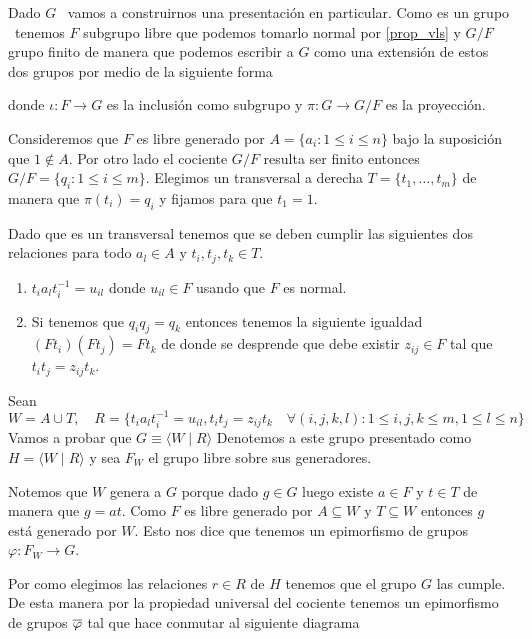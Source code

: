 \documentclass[tesis.tex]{subfiles}
\begin{document}
\begin{obs}\label{obs_presentacion_vl}
	Dado $G$ \vl \ vamos a construirnos una presentación en particular.
	Como es un grupo \vl \ tenemos $F$ subgrupo libre que podemos tomarlo normal por \ref{prop_vls} y $G/F$ grupo finito de manera que podemos escribir a $G$ como una extensión de estos dos grupos por medio de la siguiente forma
	\begin{center}
	\end{center}
	donde $\iota: F \to G$ es la inclusión como subgrupo y $\pi: G \to G/F$ es la proyección.

	
	Consideremos que $F$ es libre generado por $A = \{ a_i : 1 \le i \le n \}$ bajo la suposición que $1 \notin A$.
	Por otro lado el cociente $G/F$ resulta ser finito entonces $G/F = \{ q_i : 1 \le i \le m \}$.
	Elegimos un transversal a derecha $T = \{ t_1, \dots, t_m \}$ de manera que $\pi(t_i)= q_i$ y fijamos para que $t_1 = 1$.
	
	Dado que es un transversal tenemos que se deben cumplir las siguientes dos relaciones para todo $a_l \in A$ y $t_i,t_j,t_k \in T$. 
	\begin{enumerate}
		\item $t_ia_{l}t_i^{-1} = u_{il}$ donde $u_{il} \in F$ usando que $F$ es normal.
		\item Si tenemos que $q_iq_j = q_k$ entonces tenemos la siguiente igualdad 
		$(Ft_{i}) (Ft_{j}) = Ft_{k}$
		de donde se desprende que debe existir $z_{ij} \in F$ tal que 
		 $t_it_j = z_{ij}t_k$.
	\end{enumerate}
	Sean
	\[
		W = A \cup T, \quad R = \{t_ia_{l}t_i^{-1} = u_{il},  t_it_j = z_{ij}t_k \quad \forall (i,j,k,l) :   1 \le i,j,k \le m, 1 \le l  \le n \}
	\]
	Vamos a probar que $G \equiv \langle W \mid R \rangle$ 
	Denotemos a este grupo presentado como $H = \langle W \mid R \rangle$ y sea $F_{W}$ el grupo libre sobre sus generadores.
	
	Notemos que $W$ genera a $G$ porque
	dado $g \in G$ luego existe $a \in F$ y $t \in T$ de manera que $g = at$.
	Como $F$ es libre generado por $A \subseteq W$ y $T \subseteq W$ entonces $g$ está generado por $W$. 
	Esto nos dice que tenemos un epimorfismo de grupos $\varphi: F_{W} \to G$.
	
	Por como elegimos las relaciones $r \in R$ de $H$ tenemos que el grupo $G$ las cumple.
	De esta manera por la propiedad universal del cociente tenemos un epimorfismo de grupos $\overline \varphi$ tal que hace conmutar al siguiente diagrama	
	\begin{center}
	\end{center}
	

\end{obs}
\end{document}
